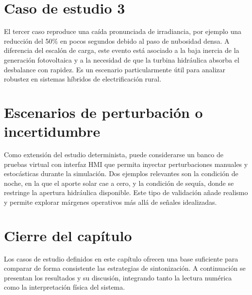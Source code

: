 \section{Caso de estudio 3}
El tercer caso reproduce una caída pronunciada de irradiancia, por ejemplo una reducción del
50\% en pocos segundos debido al paso de nubosidad densa. A diferencia del escalón de carga,
este evento está asociado a la baja inercia de la generación fotovoltaica y a la necesidad de que
la turbina hidráulica absorba el desbalance con rapidez. Es un escenario particularmente útil
para analizar robustez en sistemas híbridos de electrificación rural.

\section{Escenarios de perturbación o incertidumbre}
Como extensión del estudio determinista, puede considerarse un banco de pruebas virtual con
interfaz HMI que permita inyectar perturbaciones manuales y estocásticas durante la
simulación. Dos ejemplos relevantes son la condición de noche, en la que el aporte solar cae a
cero, y la condición de sequía, donde se restringe la apertura hidráulica disponible. Este tipo de
validación añade realismo y permite explorar márgenes operativos más allá de señales idealizadas.

\section{Cierre del capítulo}
Los casos de estudio definidos en este capítulo ofrecen una base suficiente para comparar de
forma consistente las estrategias de sintonización. A continuación se presentan los resultados y
su discusión, integrando tanto la lectura numérica como la interpretación física del sistema.
